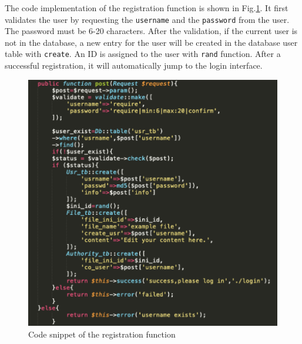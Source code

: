 \noindent The code implementation of the registration function is shown in Fig.\ref{png1}. It first validates the user by requesting the \texttt{username} and the \texttt{password} from the user. The password must be 6-20 characters. After the validation, if the current user is not in the database, a new entry for the user will be created in the database user table with \texttt{create}. An ID is assigned to the user with \texttt{rand} function. After a successful registration, it will automatically jump to the login interface.


\begin{figure}[H]
  \centering
  \includegraphics[width=.8\textwidth]{register.png} %
  \caption{Code snippet of the registration function} %
  \label{png1} %
\end{figure}


